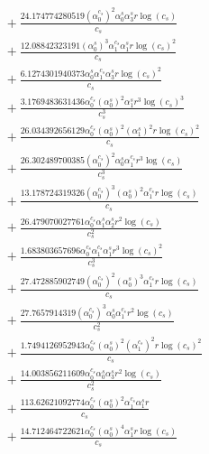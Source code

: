 \documentclass[10pt]{article}
\begin{document}
\begin{align*}
&{}  + \frac{24.174774280519 \left(\alpha_{0}^{c_s}\right)^{2} \alpha_{0}^s \alpha_{3}^s r \log{\left(c_{s} \right)}}{c_{s}} \\
&{}  + \frac{12.08842323191 \left(\alpha_{0}^s\right)^{3} \alpha_{1}^{c_s} \alpha_{1}^s r \log{\left(c_{s} \right)}^{2}}{c_{s}} \\
&{}  + \frac{6.1274301940373 \alpha_{0}^s \alpha_{1}^{c_s} \alpha_{3}^s r \log{\left(c_{s} \right)}^{2}}{c_{s}} \\
&{}  + \frac{3.1769483631436 \alpha_{0}^{c_s} \left(\alpha_{0}^s\right)^{2} \alpha_{1}^s r^{3} \log{\left(c_{s} \right)}^{3}}{c_{s}^{3}} \\
&{}  + \frac{26.034392656129 \alpha_{0}^{c_s} \left(\alpha_{0}^s\right)^{2} \left(\alpha_{1}^s\right)^{2} r \log{\left(c_{s} \right)}^{2}}{c_{s}} \\
&{}  + \frac{26.302489700385 \left(\alpha_{0}^{c_s}\right)^{2} \alpha_{0}^s \alpha_{1}^{c_s} r^{3} \log{\left(c_{s} \right)}}{c_{s}^{3}} \\
&{}  + \frac{13.178724319326 \left(\alpha_{0}^{c_s}\right)^{3} \left(\alpha_{0}^s\right)^{2} \alpha_{1}^{c_s} r \log{\left(c_{s} \right)}}{c_{s}} \\
&{}  + \frac{26.479070027761 \alpha_{0}^{c_s} \alpha_{1}^s \alpha_{2}^s r^{2} \log{\left(c_{s} \right)}}{c_{s}^{2}} \\
&{}  + \frac{1.683803657696 \alpha_{0}^{c_s} \alpha_{1}^{c_s} \alpha_{1}^s r^{3} \log{\left(c_{s} \right)}^{2}}{c_{s}^{3}} \\
&{}  + \frac{27.472885902749 \left(\alpha_{0}^{c_s}\right)^{2} \left(\alpha_{0}^s\right)^{3} \alpha_{1}^{c_s} r \log{\left(c_{s} \right)}}{c_{s}} \\
&{}  + \frac{27.7657914319 \left(\alpha_{0}^{c_s}\right)^{3} \alpha_{0}^s \alpha_{1}^{c_s} r^{2} \log{\left(c_{s} \right)}}{c_{s}^{2}} \\
&{}  + \frac{1.7494126952943 \alpha_{0}^{c_s} \left(\alpha_{0}^s\right)^{2} \left(\alpha_{1}^{c_s}\right)^{2} r \log{\left(c_{s} \right)}^{2}}{c_{s}} \\
&{}  + \frac{14.003856211609 \alpha_{0}^{c_s} \alpha_{0}^s \alpha_{3}^s r^{2} \log{\left(c_{s} \right)}}{c_{s}^{2}} \\
&{}  + \frac{113.62621092774 \alpha_{0}^{c_s} \left(\alpha_{0}^s\right)^{2} \alpha_{1}^{c_s} \alpha_{1}^s r}{c_{s}} \\
&{}  + \frac{14.712464722621 \alpha_{0}^{c_s} \left(\alpha_{0}^s\right)^{4} \alpha_{1}^s r \log{\left(c_{s} \right)}}{c_{s}} \\

\end{align*}
\end{document}
